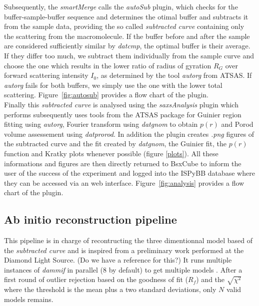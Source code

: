 \documentclass[preprint,pdf]{iucr}              %
\begin{document}
Subsequently, the \textit{smartMerge} calls the \textit{autoSub} plugin, which checks for the buffer-sample-buffer
sequence and determines the otimal buffer and subtracts it from the
sample data, providing the so called \textit{subtracted curve} containing only
the scattering from the macromolecule. If the buffer before and after the sample are considered sufficiently similar by \textit{datcmp}, the optimal buffer is their average. If they differ too much, we subtract them individually from the sample curve and choose the one which results in the lower ratio of radius of gyration $R_{G}$ over forward scattering intensity $I_{0}$, as determined by the tool \textit{autorg} from ATSAS. If \textit{autorg} fails for both buffers, we simply use the one with the lower total scattering. Figure~\ref{fig:autosub} provides a flow chart of the plugin.\\

Finally this \textit{subtracted curve} is analysed using the 
\textit{saxsAnalysis} plugin which performs  subsequently uses tools from the ATSAS package for Guinier region fitting
using \textit{autorg}, Fourier transform using \textit{datgnom} to obtain
$p(r)$ and Porod volume assessement using \textit{datprorod}. In addition the plugin creates \textit{.png} figures of the subtracted curve and the fit created by \textit{datgnom}, the Guinier fit, the $p(r)$ function and Kratky plots whenever possible (figure \ref{plots}).
All these informations and figures are then directly returned to BsxCube to inform the user
of the success of the experiment and logged into the ISPyBB
database\cite{ispybb} where they can be accessed via an web interface. Figure~\ref{fig:analysis} provides a flow chart of the plugin.

\subsection{Ab initio reconstruction pipeline}

This pipeline is in charge of recontructing the three dimentionnal model based
of the \textit{subtracted curve} and is inspired from a preliminary work
performed at the Diamond Light Source. (Do we have a reference for this?)
It runs multiple instances of \textit{dammif} in parallel (8 by default) to get
multiple models \cite{dammif}. 
After a first round of outlier rejection based on the goodness of fit ($R_{f}$) and the
$\sqrt{\chi^{2}}$  where the threshold is the mean plus a two standard
deviations, only $N$ valid models remains. 
\end{document}
